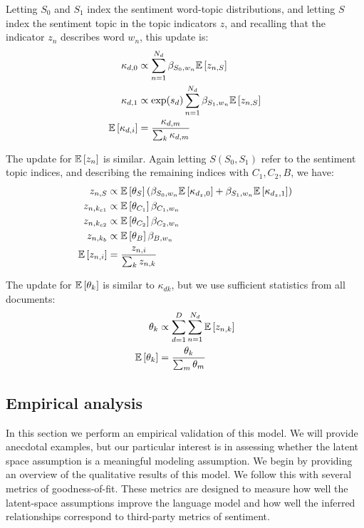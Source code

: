Letting $S_0$ and $S_1$ index the sentiment word-topic distributions,
and letting $S$ index the sentiment topic in the topic indicators $z$,
and recalling that the indicator $z_n$ describes word $w_n$, this
update is:
\begin{align}
  \kappa_{d,0} & \propto \sum_{n=1}^{N_d} \beta_{S_0,w_n} \mathbb{E}\left[z_{n,S}\right] \nonumber \\
  \kappa_{d,1} & \propto \exp(s_d) \sum_{n=1}^{N_d} \beta_{S_1,w_n} \mathbb{E}\left[z_{n,S}\right] \nonumber \\
  \mathbb{E}\left[\kappa_{d,i}\right] & = \frac{\kappa_{d,m}} { \sum_k \kappa_{d,m} } \nonumber \\
\end{align}

The update for $\mathbb{E}\left[z_{n}\right]$ is similar.  Again letting $S (S_0,
S_1)$ refer to the sentiment topic indices, and describing the
remaining indices with $C_1, C_2, B$, we have:
\begin{align}
  z_{n,S} & \propto \mathbb{E}\left[\theta_{S}\right] \left( \beta_{S_0,w_n} \mathbb{E}\left[\kappa_{d_z, 0}\right] + \beta_{S_1,w_n} \mathbb{E}\left[\kappa_{d_z, 1}\right] \right) \nonumber \\
  z_{n,k_{c1}} & \propto \mathbb{E}\left[\theta_{C_1}\right] \beta_{C_1,w_n}  \nonumber \\
  z_{n,k_{c2}} & \propto \mathbb{E}\left[\theta_{C_2}\right] \beta_{C_2,w_n} \nonumber \\
  z_{n,k_{b}} & \propto \mathbb{E}\left[\theta_{B}\right] \beta_{B,w_n} \nonumber \\
  \mathbb{E}\left[z_{n,i}\right] & = \frac{ z_{n,i}} { \sum_k z_{n,k} } \label{equation:fr_e_z}
\end{align}

The update for $\mathbb{E}\left[\theta_k\right]$ is similar to $\kappa_{dk}$, but we use sufficient statistics from all documents:
\begin{align}
  \theta_{k} & \propto \sum_{d=1}^D \sum_{n=1}^{N_d} \mathbb{E}\left[z_{n,k}\right] \nonumber \\
  \mathbb{E}\left[\theta_{k}\right] & = \frac{\theta_{k}} { \sum_m \theta_{m} } \nonumber \\
\end{align}

\subsection*{Empirical analysis}

In this section we perform an empirical validation of this model.  We
will provide anecdotal examples, but our particular interest is in
assessing whether the latent space assumption is a meaningful modeling
assumption.  We begin by providing an overview of the qualitative
results of this model.  We follow this with several metrics of
goodness-of-fit.  These metrics are designed to measure how well the
latent-space assumptions improve the language model and how well the
inferred relationships correspond to third-party metrics of sentiment.

